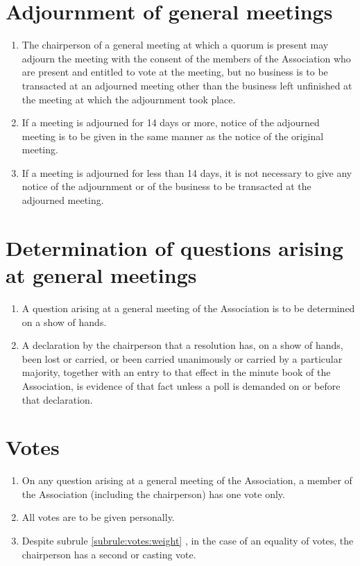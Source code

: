 \documentclass[a4paper,11pt]{article}
\begin{document}
\section{Adjournment of general meetings}
\label{rule:adjournment}

\begin{enumerate}
	\item The chairperson of a general meeting at which a quorum is present may adjourn the meeting with the consent of the members of the Association who are present and entitled to vote at the meeting, but no business is to be transacted at an adjourned meeting other than the business left unfinished at the meeting at which the adjournment took place.
	\item If a meeting is adjourned for 14 days or more, notice of the adjourned meeting is to be given in the same manner as the notice of the original meeting.
	\item If a meeting is adjourned for less than 14 days, it is not necessary to give any notice of the adjournment or of the business to be transacted at the adjourned meeting.
\end{enumerate}

\section{Determination of questions arising at general meetings}
\label{rule:questions}

\begin{enumerate}
	\item A question arising at a general meeting of the Association is to be determined on a show of hands.
	\item A declaration by the chairperson that a resolution has, on a show of hands, been lost or carried, or been carried unanimously or carried by a particular majority, together with an entry to that effect in the minute book of the Association, is evidence of that fact unless a poll is demanded on or before that declaration.
\end{enumerate}

\section{Votes}
\label{rule:votes}

\begin{enumerate}
	\item \label{subrule:votes:weight} On any question arising at a general meeting of the Association, a member of the Association (including the chairperson) has one vote only.
	\item All votes are to be given personally.
	\item Despite subrule \ref{subrule:votes:weight} , in the case of an equality of votes, the chairperson has a second or casting vote.
\end{enumerate}
\end{document}
